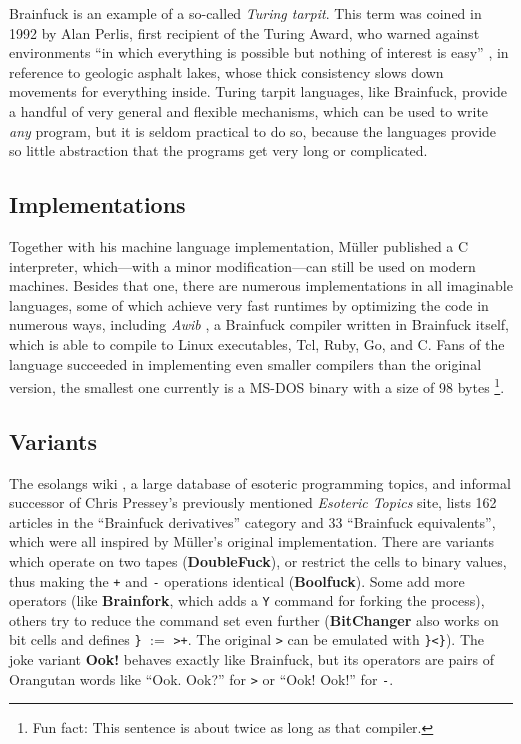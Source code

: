 Brainfuck is an example of a so-called \emph{Turing tarpit}. This term was coined in 1992 by Alan Perlis, first recipient of the Turing Award, who warned against environments “in which everything is possible but nothing of interest is easy” \cite{perlis1982epigrams}, in reference to geologic asphalt lakes, whose thick consistency slows down movements for everything inside. Turing tarpit languages, like Brainfuck, provide a handful of very general and flexible mechanisms, which can be used to write \emph{any} program, but it is seldom practical to do so, because the languages provide so little abstraction that the programs get very long or complicated.

\subsection{Implementations}

Together with his machine language implementation, Müller published a C interpreter, which---with a minor modification---can still be used on modern machines. Besides that one, there are numerous implementations in all imaginable languages, some of which achieve very fast runtimes by optimizing the code in numerous ways, including \emph{Awib} \cite{linander_awib}, a Brainfuck compiler written in Brainfuck itself, which is able to compile to Linux executables, Tcl, Ruby, Go, and C. Fans of the language succeeded in implementing even smaller compilers than the original version, the smallest one currently is a MS-DOS binary with a size of 98 bytes \cite{inte1999entry}\footnote{Fun fact: This sentence is about twice as long as that compiler.}.

\subsection{Variants}
\label{sec:brainfuck_variants}

The esolangs wiki \cite{esolang}, a large database of esoteric programming topics, and informal successor of Chris Pressey's previously mentioned \emph{Esoteric Topics} site, lists 162 articles in the “Brainfuck derivatives” category and 33 “Brainfuck equivalents”, which were all inspired by Müller's original implementation. There are variants which operate on two tapes (\textbf{DoubleFuck}), or restrict the cells to binary values, thus making the \texttt{+} and \texttt{-} operations identical (\textbf{Boolfuck}). Some add more operators (like \textbf{Brainfork}, which adds a \texttt{Y} command for forking the process), others try to reduce the command set even further (\textbf{BitChanger} also works on bit cells and defines \texttt{\}} $:=$ \texttt{>+}. The original \texttt{>} can be emulated with \texttt{\}<\}}).
The joke variant \textbf{Ook!} behaves exactly like Brainfuck, but its operators are pairs of Orangutan words like “Ook. Ook?” for \texttt{>} or “Ook! Ook!” for \texttt{-}.

